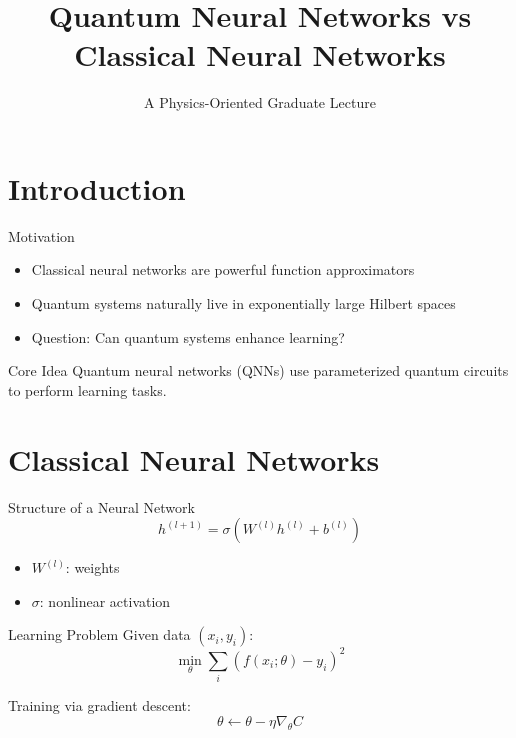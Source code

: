 \documentclass{beamer}
\title{Quantum Neural Networks vs Classical Neural Networks}
\subtitle{A Physics-Oriented Graduate Lecture}
\author{}
\date{}
\begin{document}
\frame{\titlepage}

\section{Introduction}

\begin{frame}{Motivation}
\begin{itemize}
\item Classical neural networks are powerful function approximators
\item Quantum systems naturally live in exponentially large Hilbert spaces
\item Question: Can quantum systems enhance learning?
\end{itemize}

\medskip

\begin{block}{Core Idea}
Quantum neural networks (QNNs) use parameterized quantum circuits to perform learning tasks.
\end{block}
\end{frame}

\section{Classical Neural Networks}

\begin{frame}{Structure of a Neural Network}
\[
h^{(l+1)} = \sigma(W^{(l)} h^{(l)} + b^{(l)})
\]

\begin{itemize}
\item $W^{(l)}$: weights
\item $\sigma$: nonlinear activation
\end{itemize}
\end{frame}


\begin{frame}{Learning Problem}
Given data $(x_i,y_i)$:
\[
\min_\theta \sum_i (f(x_i;\theta) - y_i)^2
\]

Training via gradient descent:
\[
\theta \leftarrow \theta - \eta \nabla_\theta C
\]
\end{frame}

\end{document}
